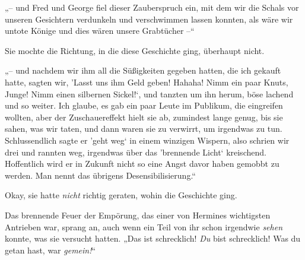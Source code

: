 „– und Fred und George fiel dieser Zauberspruch ein, mit dem wir die Schals vor unseren Gesichtern verdunkeln und verschwimmen lassen konnten, als wäre wir untote Könige und dies wären unsere Grabtücher –“

Sie mochte die Richtung, in die diese Geschichte ging, überhaupt nicht.

„– und nachdem wir ihm all die Süßigkeiten gegeben hatten, die ich gekauft hatte, sagten wir, ’Lasst uns ihm Geld geben! Hahaha! Nimm ein paar Knuts, Junge! Nimm einen silbernen Sickel!‘, und tanzten um ihn herum, böse lachend und so weiter. Ich glaube, es gab ein paar Leute im Publikum, die eingreifen wollten, aber der Zuschauereffekt hielt sie ab, zumindest lange genug, bis sie sahen, was wir taten, und dann waren sie zu verwirrt, um irgendwas zu tun. Schlussendlich sagte er ’geht weg‘ in einem winzigen Wispern, also schrien wir drei und rannten weg, irgendwas über das ’brennende Licht‘ kreischend. Hoffentlich wird er in Zukunft nicht so eine Angst davor haben gemobbt zu werden. Man nennt das übrigens Desensibilisierung.“

Okay, sie hatte \emph{nicht} richtig geraten, wohin die Geschichte ging.

Das brennende Feuer der Empörung, das einer von Hermines wichtigsten Antrieben war, sprang an, auch wenn ein Teil von ihr schon irgendwie \emph{sehen} konnte, was sie versucht hatten. „Das ist schrecklich! \emph{Du} bist schrecklich! Was du getan hast, war \emph{gemein!}“

